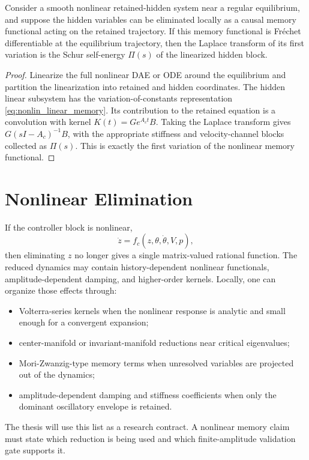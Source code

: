 \begin{theorem}
\label{thm:nonlin_self_energy_tangent}
Consider a smooth nonlinear retained-hidden system near a regular equilibrium,
and suppose the hidden variables can be eliminated locally as a causal memory
functional acting on the retained trajectory. If this memory functional is
Fr\'echet differentiable at the equilibrium trajectory, then the Laplace
transform of its first variation is the Schur self-energy \(\Pi(s)\) of the
linearized hidden block.
\end{theorem}

\begin{proof}
Linearize the full nonlinear DAE or ODE around the equilibrium and partition
the linearization into retained and hidden coordinates. The hidden linear
subsystem has the variation-of-constants representation
\eqref{eq:nonlin_linear_memory}. Its contribution to the retained equation is
a convolution with kernel \(K(t)=Ge^{A_ct}B\). Taking the Laplace transform
gives \(G(sI-A_c)^{-1}B\), with the appropriate stiffness and velocity-channel
blocks collected as \(\Pi(s)\). This is exactly the first variation of the
nonlinear memory functional.
\end{proof}

\section{Nonlinear Elimination}

If the controller block is nonlinear,
\begin{equation}
  \dot z=f_c(z,\theta,\dot\theta,V,p),
  \label{eq:nonlin_nonlinear_controller}
\end{equation}
then eliminating \(z\) no longer gives a single matrix-valued rational function.
The reduced dynamics may contain history-dependent nonlinear functionals,
amplitude-dependent damping, and higher-order kernels. Locally, one can
organize those effects through:
\begin{itemize}
\item Volterra-series kernels when the nonlinear response is analytic and
small enough for a convergent expansion;
\item center-manifold or invariant-manifold reductions near critical
eigenvalues;
\item Mori-Zwanzig-type memory terms when unresolved variables are projected
out of the dynamics;
\item amplitude-dependent damping and stiffness coefficients when only the
dominant oscillatory envelope is retained.
\end{itemize}
The thesis will use this list as a research contract. A nonlinear memory claim
must state which reduction is being used and which finite-amplitude validation
gate supports it.

